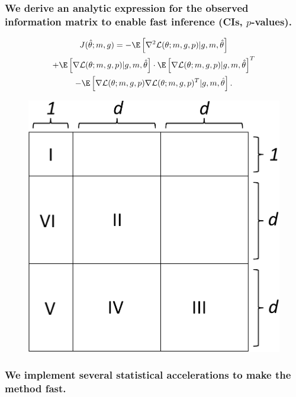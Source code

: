 \documentclass{beamer}
\begin{document}
\begin{frame}
\frametitle{We derive an analytic expression for the observed information matrix to enable fast inference (CIs, $p$-values).}

\begin{multline*}
J(\hat{\theta}; m, g) = -\E \left[\nabla^2 \mathcal{L}(\theta; m, g, p) | g, m, \hat{\theta} \right] \\ + \E\left[ \nabla \mathcal{L}(\theta; m, g, p) |  g, m, \hat{\theta} \right] \cdot \E\left[ \nabla \mathcal{L}(\theta; m, g, p) | g, m, \hat{\theta}\right]^T \\ - \E\left[ \nabla\mathcal{L}(\theta; m, g, p) \nabla \mathcal{L}(\theta; m, g, p)^T | g, m, \hat{\theta} \right].
\end{multline*}

\begin{figure}
\centering
\includegraphics[width=0.4\linewidth]{extra_figs/fig3_crop}
\end{figure}
\end{frame}

\begin{frame}
\frametitle{We implement several statistical accelerations to make the method fast.}
\end{frame}

% 




\end{document}
